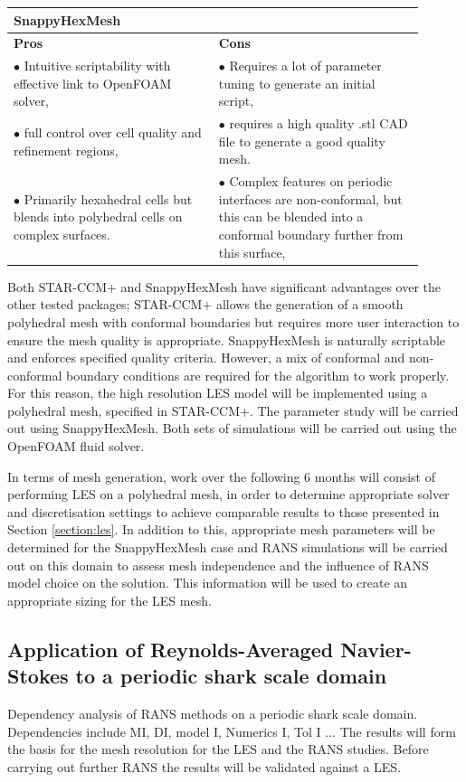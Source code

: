 \documentclass[12pt,oneside,a4paper]{article}
\begin{document}
\begin{table}[!t]
\begin{tabular}{p{0.45\linewidth}p{0.45\linewidth}}
\textbf{SnappyHexMesh}	&	\\
\hline
\textbf{Pros}	&	\textbf{Cons}	\\
$\bullet$	Intuitive scriptability with effective link to OpenFOAM solver,
&
$\bullet$ Requires a lot of parameter tuning to generate an initial script,
\\
$\bullet$	full control over cell quality and refinement regions,
&
$\bullet$ requires a high quality .stl CAD file to generate a good quality mesh.
\\
$\bullet$	Primarily hexahedral cells but blends into polyhedral cells on complex surfaces.
&
$\bullet$	Complex features on periodic interfaces are non-conformal, but this can be blended into a conformal boundary further from this surface,

\end{tabular}
\end{table}

Both STAR-CCM+ and SnappyHexMesh have significant advantages over the other tested packages; STAR-CCM+ allows the generation of a smooth polyhedral mesh with conformal boundaries but requires more user interaction to ensure the mesh quality is appropriate. SnappyHexMesh is naturally scriptable and enforces specified quality criteria. However, a mix of conformal and non-conformal boundary conditions are required for the algorithm to work properly. For this reason, the high resolution LES model will be implemented using a polyhedral mesh, specified in STAR-CCM+. The parameter study will be carried out using SnappyHexMesh. Both sets of simulations will be carried out using the OpenFOAM fluid solver.

In terms of mesh generation, work over the following 6 months will consist of performing LES on a polyhedral mesh, in order to determine appropriate solver and discretisation settings to achieve comparable results to those presented in Section \ref{section:les}. In addition to this, appropriate mesh parameters will be determined for the SnappyHexMesh case and RANS simulations will be carried out on this domain to assess mesh independence and the influence of RANS model choice on the solution. This information will be used to create an appropriate sizing for the LES mesh.

\newpage
\subsection{Application of Reynolds-Averaged Navier-Stokes to a periodic shark scale domain}
\label{section:rans}
Dependency analysis of RANS methods on a periodic shark scale domain.
Dependencies include MI, DI, model I, Numerics I, Tol I ...
The results will form the basis for the mesh resolution for the LES and the RANS studies. Before carrying out further RANS the results will be validated against a LES. 
\end{document}
